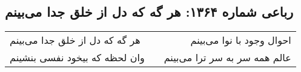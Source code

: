 \begin{center}
\section*{رباعی شماره ۱۳۶۴: هر گه که دل از خلق جدا می‌بینم}
\label{sec:1364}
\begin{longtable}{l p{0.5cm} r}
هر گه که دل از خلق جدا می‌بینم
&&
احوال وجود با نوا می‌بینم
\\
وان لحظه که بیخود نفسی بنشینم
&&
عالم همه سر به سر ترا می‌بینم
\\
\end{longtable}
\end{center}
